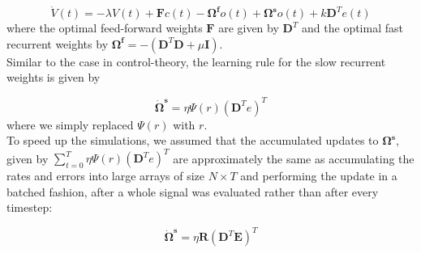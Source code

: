\documentclass[twoside,11pt,titlepage]{article}
\begin{document}
\begin{equation*}
  \dot{V}(t) = -\lambda V(t) + \mathbf{F}c(t) - \mathbf{\Omega^f}o(t) + \mathbf{\Omega^s}o(t) + k\mathbf{D}^Te(t)
\end{equation*}
where the optimal feed-forward weights $\mathbf{F}$ are given by $\mathbf{D}^T$ and the optimal fast recurrent weights by $\mathbf{\Omega^f}=-(\mathbf{D}^T\mathbf{D} + \mu\mathbf{I})$. \\
Similar to the case in control-theory, the learning rule for the slow recurrent weights is given by

\begin{equation*}
  \dot{\mathbf{\Omega}}^\mathbf{s} = \eta \Psi(r)(\mathbf{D}^Te)^T
\end{equation*}
where we simply replaced $\Psi(r)$ with $r$. \\
To speed up the simulations, we assumed that the accumulated updates to $\mathbf{\Omega^s}$, given by $\sum_{t=0}^{T}{\eta \Psi(r)(\mathbf{D}^Te)^T}$ are approximately the same as
accumulating the rates and errors into large arrays of size $N \times T$ and performing the update in a batched fashion, after a whole signal was evaluated rather than after every timestep:

\begin{equation*}
  \dot{\mathbf{\Omega}}^\mathbf{s} = \eta \mathbf{R}(\mathbf{D}^T\mathbf{E})^T
\end{equation*}
\end{document}

